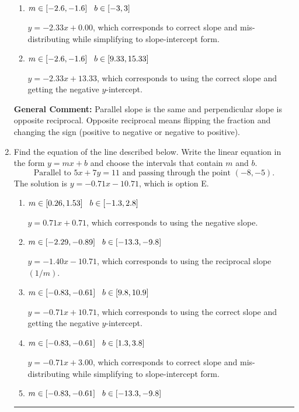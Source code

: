 \documentclass{extbook}[14pt]
\newcommand{\litem}[1]{\item #1

\rule{\textwidth}{0.4pt}}
\begin{document}
\begin{enumerate}
{\begin{enumerate}[label=\Alph*.]
 $y = -0.43x - 13.33$, which corresponds to using the reciprocal slope $(1/m)$.
\item \( m \in [-2.6, -1.6] \hspace*{3mm} b \in [-3, 3] \)

 $y = -2.33x + 0.00$, which corresponds to correct slope and mis-distributing while simplifying to slope-intercept form.
\item \( m \in [-2.6, -1.6] \hspace*{3mm} b \in [9.33, 15.33] \)

 $y = -2.33x + 13.33$, which corresponds to using the correct slope and getting the negative $y$-intercept.
\end{enumerate}

\textbf{General Comment:} Parallel slope is the same and perpendicular slope is opposite reciprocal. Opposite reciprocal means flipping the fraction and changing the sign (positive to negative or negative to positive).
}
\litem{
Find the equation of the line described below. Write the linear equation in the form $ y=mx+b $ and choose the intervals that contain $m$ and $b$.
\[ \text{Parallel to } 5 x + 7 y = 11 \text{ and passing through the point } (-8, -5). \]The solution is \( y = -0.71x - 10.71 \), which is option E.\begin{enumerate}[label=\Alph*.]
\item \( m \in [0.26, 1.53] \hspace*{3mm} b \in [-1.3, 2.8] \)

 $y = 0.71x + 0.71$, which corresponds to using the negative slope.
\item \( m \in [-2.29, -0.89] \hspace*{3mm} b \in [-13.3, -9.8] \)

 $y = -1.40x - 10.71$, which corresponds to using the reciprocal slope $(1/m)$.
\item \( m \in [-0.83, -0.61] \hspace*{3mm} b \in [9.8, 10.9] \)

 $y = -0.71x + 10.71$, which corresponds to using the correct slope and getting the negative $y$-intercept.
\item \( m \in [-0.83, -0.61] \hspace*{3mm} b \in [1.3, 3.8] \)

 $y = -0.71x + 3.00$, which corresponds to correct slope and mis-distributing while simplifying to slope-intercept form.
\item \( m \in [-0.83, -0.61] \hspace*{3mm} b \in [-13.3, -9.8] \)


\end{enumerate}}
\end{enumerate}
\end{document}
